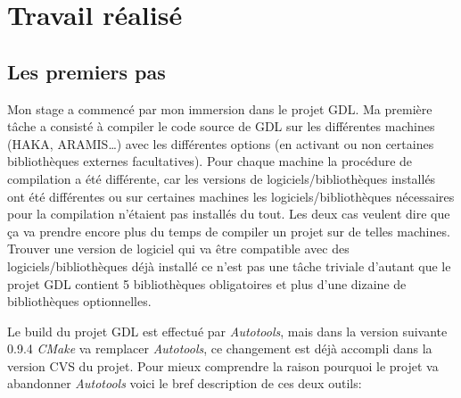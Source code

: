 \section{Travail réalisé}
\label{p3}
\subsection{Les premiers pas}

Mon stage a commencé par mon immersion dans le projet GDL. Ma première tâche a
consisté à compiler le code source de GDL sur les différentes machines
(\textsc{\small HAKA, ARAMIS\ldots}) avec les différentes options (en
activant ou non certaines bibliothèques externes facultatives). Pour chaque
machine la procédure de compilation a été différente, car les versions de
logiciels/bibliothèques installés ont été différentes ou sur certaines machines
les logiciels/bibliothèques nécessaires pour la compilation n’étaient pas
installés du tout. Les deux cas veulent dire que ça va prendre encore plus du
temps de compiler un projet sur de telles machines. Trouver une version de
logiciel qui va être compatible avec des logiciels/bibliothèques déjà installé
ce n'est pas une tâche triviale d'autant que le projet GDL contient 5 bibliothèques
obligatoires et plus d'une dizaine de bibliothèques optionnelles.

Le build du projet GDL est effectué par \textit{Autotools}, mais dans la version
suivante 0.9.4 \textit{CMake} va remplacer \textit{Autotools}, ce changement est
déjà accompli dans la version CVS du projet. Pour mieux comprendre la raison
pourquoi le projet va abandonner \textit{Autotools} voici le bref description de
ces deux outils:

